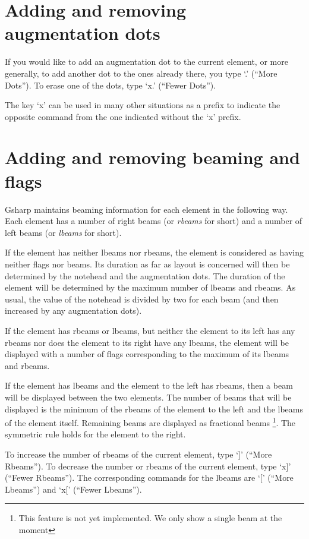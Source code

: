 \documentclass[11pt]{book}
\def\gs{Gsharp}
\def\unimp#1{\footnote{This feature is not yet implemented.  #1}}
\def\kbd#1{`#1'}
\def\command#1{``#1''}
\begin{document}
\section{Adding and removing augmentation dots}

If you would like to add an augmentation dot to the current element,
or more generally, to add another dot to the ones already there, you
type \kbd{.} (\command{More Dots}).  To erase one of the dots, type
\kbd{x.} (\command{Fewer Dots}).

The key \kbd{x} can be used in many other situations as a prefix to
indicate the opposite command from the one indicated without the
\kbd{x} prefix.

\section{Adding and removing beaming and flags}

{\gs} maintains beaming information for each element in the following
way.  Each element has a number of right beams (or \emph{rbeams} for
short) and a number of left beams (or \emph{lbeams} for short). 

If the element has neither lbeams nor rbeams, the element is
considered as having neither flags nor beams.  Its duration as far as
layout is concerned will then be determined by the notehead and the
augmentation dots.  The duration of the element will be determined by
the maximum number of lbeams and rbeams.  As usual, the value of the
notehead is divided by two for each beam (and then increased by any
augmentation dots).

If the element has rbeams or lbeams, but neither the element to its
left has any rbeams nor does the element to its right have any lbeams,
the element will be displayed with a number of flags corresponding to
the maximum of its lbeams and rbeams.

If the element has lbeams and the element to the left has rbeams, then
a beam will be displayed between the two elements.  The number of
beams that will be displayed is the minimum of the rbeams of the
element to the left and the lbeams of the element itself.  Remaining
beams are displayed as fractional beams \unimp{We only show a single
  beam at the moment}.  The symmetric rule holds for the element to
the right. 

To increase the number of rbeams of the current element, type \kbd{]}
  (\command{More Rbeams}).  To decrease the number or rbeams of the
  current element, type \kbd{x]} (\command{Fewer Rbeams}).  The
  corresponding commands for the lbeams are \kbd{[} (\command{More
  Lbeams}) and \kbd{x[} (\command{Fewer Lbeams}). 
\end{document}
